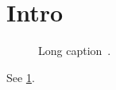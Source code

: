 \documentclass{article}
\begin{document}
\listoffigures
\section{Intro}\label{sec:fig}
\begin{figure}[t]
\caption[Short caption~\cite{k1} (\ref{sec:fig})]{Long caption~\cite{k2}.}\label{fig:cap}
\end{figure}
See \ref{fig:cap}.


\end{document}
